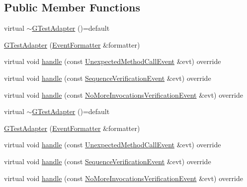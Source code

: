 \subsection*{Public Member Functions}
\begin{DoxyCompactItemize}
\item 
virtual \mbox{\hyperlink{structfakeit_1_1GTestAdapter_a8ea78d344dd10f467f46c57fb5962312}{$\sim$\+G\+Test\+Adapter}} ()=default
\item 
\mbox{\hyperlink{structfakeit_1_1GTestAdapter_a4aa0999134883c0002463e4976d466fb}{G\+Test\+Adapter}} (\mbox{\hyperlink{structfakeit_1_1EventFormatter}{Event\+Formatter}} \&formatter)
\item 
virtual void \mbox{\hyperlink{structfakeit_1_1GTestAdapter_a68bb18a833f63973f09d12597deb1cf7}{handle}} (const \mbox{\hyperlink{structfakeit_1_1UnexpectedMethodCallEvent}{Unexpected\+Method\+Call\+Event}} \&evt) override
\item 
virtual void \mbox{\hyperlink{structfakeit_1_1GTestAdapter_ae97137644f1ec31fbd146a901ea81557}{handle}} (const \mbox{\hyperlink{structfakeit_1_1SequenceVerificationEvent}{Sequence\+Verification\+Event}} \&evt) override
\item 
virtual void \mbox{\hyperlink{structfakeit_1_1GTestAdapter_af19fbc5b4c9dc6b9c6a8f94eb2b7e322}{handle}} (const \mbox{\hyperlink{structfakeit_1_1NoMoreInvocationsVerificationEvent}{No\+More\+Invocations\+Verification\+Event}} \&evt) override
\item 
virtual \mbox{\hyperlink{structfakeit_1_1GTestAdapter_a8ea78d344dd10f467f46c57fb5962312}{$\sim$\+G\+Test\+Adapter}} ()=default
\item 
\mbox{\hyperlink{structfakeit_1_1GTestAdapter_a4aa0999134883c0002463e4976d466fb}{G\+Test\+Adapter}} (\mbox{\hyperlink{structfakeit_1_1EventFormatter}{Event\+Formatter}} \&formatter)
\item 
virtual void \mbox{\hyperlink{structfakeit_1_1GTestAdapter_a68bb18a833f63973f09d12597deb1cf7}{handle}} (const \mbox{\hyperlink{structfakeit_1_1UnexpectedMethodCallEvent}{Unexpected\+Method\+Call\+Event}} \&evt) override
\item 
virtual void \mbox{\hyperlink{structfakeit_1_1GTestAdapter_ae97137644f1ec31fbd146a901ea81557}{handle}} (const \mbox{\hyperlink{structfakeit_1_1SequenceVerificationEvent}{Sequence\+Verification\+Event}} \&evt) override
\item 
virtual void \mbox{\hyperlink{structfakeit_1_1GTestAdapter_af19fbc5b4c9dc6b9c6a8f94eb2b7e322}{handle}} (const \mbox{\hyperlink{structfakeit_1_1NoMoreInvocationsVerificationEvent}{No\+More\+Invocations\+Verification\+Event}} \&evt) override
\end{DoxyCompactItemize}


